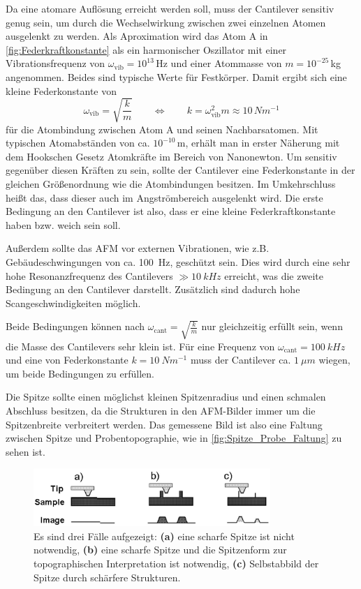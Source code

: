     Da eine atomare Auflösung erreicht werden soll, muss der Cantilever sensitiv genug sein, um durch die Wechselwirkung zwischen zwei einzelnen Atomen ausgelenkt zu werden.
    Als Aproximation wird das Atom A in \autoref{fig:Federkraftkonstante} als ein harmonischer Oszillator mit einer Vibrationsfrequenz von $\omega_{\mathrm{vib}} = 10^{13}\,$Hz und einer Atommasse von $m = 10^{-25}\,$kg angenommen.
    Beides sind typische Werte für Festkörper.
    Damit ergibt sich eine kleine Federkonstante von
    \begin{equation}
        \omega_{\mathrm{vib}} = \sqrt{\frac{k}{m}} \qquad \Leftrightarrow \qquad k = \omega_{\mathrm{vib}}^2 m \approx 10\,\si{Nm^{-1}}
    \end{equation}
    für die Atombindung zwischen Atom A und seinen Nachbarsatomen.
    Mit typischen Atomabständen von ca. $10^{-10}\,$m, erhält man in erster Näherung mit dem Hookschen Gesetz Atomkräfte im Bereich von Nanonewton.
    Um sensitiv gegenüber diesen Kräften zu sein, sollte der Cantilever eine Federkonstante in der gleichen Größenordnung wie die Atombindungen besitzen.
    Im Umkehrschluss heißt das, dass dieser auch im Angströmbereich ausgelenkt wird.
    Die erste Bedingung an den Cantilever ist also, dass er eine kleine Federkraftkonstante haben bzw. weich sein soll.

    Außerdem sollte das AFM vor externen Vibrationen, wie z.B. Gebäudeschwingungen von ca. \SI{100}{Hz}, geschützt sein.
    Dies wird durch eine sehr hohe Resonanzfrequenz des Cantilevers $\gg \SI{10}{kHz}$ erreicht, was die zweite Bedingung an den Cantilever darstellt.
    Zusätzlich sind dadurch hohe Scangeschwindigkeiten möglich.
    
    Beide Bedingungen können nach $\omega_{\mathrm{cant}} = \sqrt{\frac{k}{m}}$ nur gleichzeitig erfüllt sein, wenn die Masse des Cantilevers sehr klein ist.
    Für eine Frequenz von $\omega_{\mathrm{cant}} = \SI{100}{kHz}$ und eine von Federkonstante $k = \SI{10}{Nm^{-1}}$ muss der Cantilever ca. $\SI{1}{\mu m}$ wiegen, um beide Bedingungen zu erfüllen.

    Die Spitze sollte einen möglichst kleinen Spitzenradius und einen schmalen Abschluss besitzen, da die Strukturen in den AFM-Bilder immer um die Spitzenbreite verbreitert werden.
    Das gemessene Bild ist also eine Faltung zwischen Spitze und Probentopographie, wie in \autoref{fig:Spitze_Probe_Faltung} zu sehen ist.
    \begin{figure}[ht]
        \centering\captionsetup{format=plain}
        \includegraphics[width=0.8\textwidth]{bilder/Spitze_Probe_Faltung.png}
        \caption{Es sind drei Fälle aufgezeigt: \textbf{(a)} eine scharfe Spitze ist nicht notwendig, \textbf{(b)} eine scharfe Spitze und die Spitzenform zur topographischen Interpretation ist notwendig, \textbf{(c)} Selbstabbild der Spitze durch schärfere Strukturen.}
        \label{fig:Spitze_Probe_Faltung}
    \end{figure}

